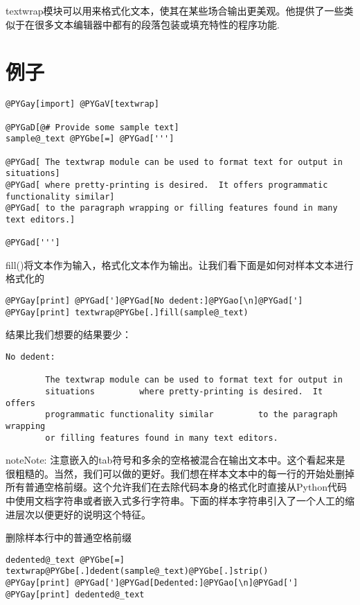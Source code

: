 \documentclass[a4paper,10pt,english]{manual}
\begin{document}
textwrap模块可以用来格式化文本，使其在某些场合输出更美观。他提供了一些类似于在很多文本编辑器中都有的段落包装或填充特性的程序功能.


\section{例子}

\begin{Verbatim}[commandchars=@\[\]]
@PYGay[import] @PYGaV[textwrap]

@PYGaD[@# Provide some sample text]
sample@_text @PYGbe[=] @PYGad[''']

@PYGad[ The textwrap module can be used to format text for output in situations]
@PYGad[ where pretty-printing is desired.  It offers programmatic functionality similar]
@PYGad[ to the paragraph wrapping or filling features found in many text editors.]

@PYGad[''']
\end{Verbatim}

fill()将文本作为输入，格式化文本作为输出。让我们看下面是如何对样本文本进行格式化的

\begin{Verbatim}[commandchars=@\[\]]
@PYGay[print] @PYGad[']@PYGad[No dedent:]@PYGao[\n]@PYGad[']
@PYGay[print] textwrap@PYGbe[.]fill(sample@_text)
\end{Verbatim}

结果比我们想要的结果要少：

\begin{Verbatim}[commandchars=@\[\]]
No dedent:

        The textwrap module can be used to format text for output in
        situations         where pretty-printing is desired.  It offers
        programmatic functionality similar         to the paragraph wrapping
        or filling features found in many text editors.
\end{Verbatim}

\begin{notice}{note}{Note:}
注意嵌入的tab符号和多余的空格被混合在输出文本中。这个看起来是很粗糙的。当然，我们可以做的更好。我们想在样本文本中的每一行的开始处删掉所有普通空格前缀。这个允许我们在去除代码本身的格式化时直接从Python代码中使用文档字符串或者嵌入式多行字符串。下面的样本字符串引入了一个人工的缩进层次以便更好的说明这个特征。
\end{notice}

删除样本行中的普通空格前缀

\begin{Verbatim}[commandchars=@\[\]]
dedented@_text @PYGbe[=] textwrap@PYGbe[.]dedent(sample@_text)@PYGbe[.]strip()
@PYGay[print] @PYGad[']@PYGad[Dedented:]@PYGao[\n]@PYGad[']
@PYGay[print] dedented@_text
\end{Verbatim}
\end{document}

